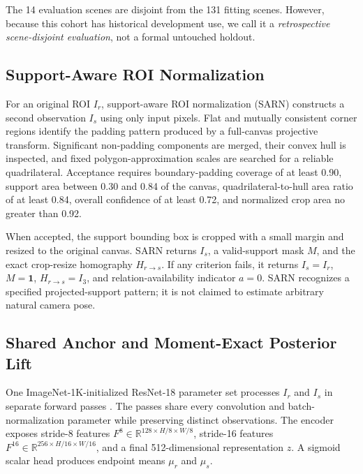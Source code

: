\documentclass[electronics,article,submit,oneauthor]{Definitions/mdpi}
\begin{document}
The 14 evaluation scenes are disjoint from the 131 fitting scenes. However, because this cohort has historical development use, we call it a \emph{retrospective scene-disjoint evaluation}, not a formal untouched holdout.

\subsection{Support-Aware ROI Normalization}
\label{subsec:sarn}

For an original ROI $I_r$, support-aware ROI normalization (SARN) constructs a second observation $I_s$ using only input pixels. Flat and mutually consistent corner regions identify the padding pattern produced by a full-canvas projective transform. Significant non-padding components are merged, their convex hull is inspected, and fixed polygon-approximation scales are searched for a reliable quadrilateral. Acceptance requires boundary-padding coverage of at least 0.90, support area between 0.30 and 0.84 of the canvas, quadrilateral-to-hull area ratio of at least 0.84, overall confidence of at least 0.72, and normalized crop area no greater than 0.92.

When accepted, the support bounding box is cropped with a small margin and resized to the original canvas. SARN returns $I_s$, a valid-support mask $M$, and the exact crop-resize homography $H_{r\rightarrow s}$. If any criterion fails, it returns $I_s=I_r$, $M=\mathbf 1$, $H_{r\rightarrow s}=I_3$, and relation-availability indicator $a=0$. SARN recognizes a specified projected-support pattern; it is not claimed to estimate arbitrary natural camera pose.

\subsection{Shared Anchor and Moment-Exact Posterior Lift}
\label{subsec:anchor}

One ImageNet-1K-initialized ResNet-18 parameter set processes $I_r$ and $I_s$ in separate forward passes \cite{he2016resnet}. The passes share every convolution and batch-normalization parameter while preserving distinct observations. The encoder exposes stride-8 features $F^8\in\mathbb R^{128\times H/8\times W/8}$, stride-16 features $F^{16}\in\mathbb R^{256\times H/16\times W/16}$, and a final 512-dimensional representation $z$. A sigmoid scalar head produces endpoint means $\mu_r$ and $\mu_s$.
\end{document}
